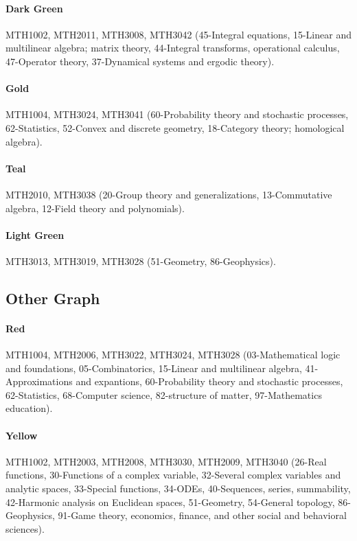 \documentclass[english, 12pt]{article}
\begin{document}
\paragraph{Dark Green} MTH1002, MTH2011, MTH3008, MTH3042 (45-Integral equations, 15-Linear and multilinear algebra; matrix theory, 44-Integral transforms, operational calculus, 47-Operator theory, 37-Dynamical systems and ergodic theory).
\paragraph{Gold} MTH1004, MTH3024, MTH3041 (60-Probability theory and stochastic processes, 62-Statistics, 52-Convex and discrete geometry, 18-Category theory; homological algebra).
\paragraph{Teal} MTH2010, MTH3038 (20-Group theory and generalizations, 13-Commutative algebra, 12-Field theory and polynomials).
\paragraph{Light Green} MTH3013, MTH3019, MTH3028 (51-Geometry, 86-Geophysics).
\parskip=0.0pt

\subsection{Other Graph} \label{app:other_graph_communities}
\paragraph{Red} MTH1004, MTH2006, MTH3022, MTH3024, MTH3028 (03-Mathematical logic and foundations, 05-Combinatorics, 15-Linear and multilinear algebra, 41-Approximations and expantions, 60-Probability theory and stochastic processes, 62-Statistics, 68-Computer science, 82-structure of matter, 97-Mathematics education).
\parskip=-16.0pt
\paragraph{Yellow} MTH1002, MTH2003, MTH2008, MTH3030, MTH2009, MTH3040 (26-Real functions, 30-Functions of a complex variable, 32-Several complex variables and analytic spaces, 33-Special functions, 34-ODEs, 40-Sequences, series, summability, 42-Harmonic analysis on Euclidean spaces, 51-Geometry, 54-General topology, 86-Geophysics, 91-Game theory, economics, finance, and other social and behavioral sciences).
\end{document}
